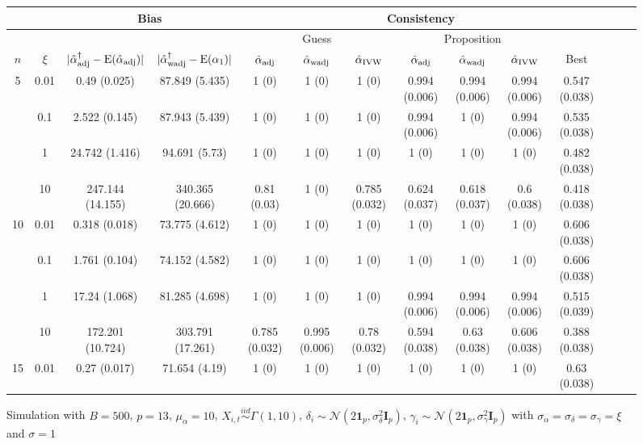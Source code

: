 \documentclass[11pt]{article}
\newcommand{\simiid}{\stackrel{iid}{\sim}} %
\def\normal#1#2{\mathcal{N}(#1,#2)} %
\def\E#1{\mathrm{E}(#1)} %
\theoremstyle{definition}
\begin{document}
\begin{sidewaysfigure}
\centering
\caption{Simulation  with $B = 500$, $p = 13$, $\mu_{\alpha}=10$, $X_{i,t} \simiid \Gamma(1,10)$, $\delta_i \sim \normal{2\mathbf{1}_p}{\sigma^2_{\delta}\mathbf{I}_p}$, $\gamma_i \sim \normal{2\mathbf{1}_p}{\sigma^2_{\gamma}\mathbf{I}_p}$ with $\sigma_{\alpha} = \sigma_{\delta}=\sigma_{\gamma}=\xi$ and $\sigma = 1$}
\begin{tabular}{cc|cc|ccc|ccc|ccc|c}
  & & \multicolumn{2}{c|}{Bias}  & \multicolumn{7}{c}{Consistency}  \\ 
  \hline 
  & &  & & \multicolumn{3}{|c|}{Guess} & \multicolumn{3}{|c|}{Proposition} & \\ 
$n$   & $\xi$ & $|\hat{\alpha}_{\rm adj}^{\dagger}-\E{\hat{\alpha}_{\rm adj}}|$ & $|\hat{\alpha}_{\rm wadj}^{\dagger}-\E{\alpha_1}|$ & $\hat{\alpha}_{\rm adj}$  & $\hat{\alpha}_{\rm wadj}$ & $\hat{\alpha}_{\rm IVW}$ & $\hat{\alpha}_{\rm adj}$  & $\hat{\alpha}_{\rm wadj}$ & $\hat{\alpha}_{\rm IVW}$ &  Best \\[.3cm]  
  \hline
\multirow{4}{*}{5} & 0.01 & 0.49 (0.025) & 87.849 (5.435) & 1 (0) & 1 (0) & 1 (0) & 0.994 (0.006) & 0.994 (0.006) & 0.994 (0.006) & 0.547 (0.038) \\ 
   & 0.1 & 2.522 (0.145) & 87.943 (5.439) & 1 (0) & 1 (0) & 1 (0) & 0.994 (0.006) & 1 (0) & 0.994 (0.006) & 0.535 (0.038) \\ 
   & 1 & 24.742 (1.416) & 94.691 (5.73) & 1 (0) & 1 (0) & 1 (0) & 1 (0) & 1 (0) & 1 (0) & 0.482 (0.038) \\ 
    & 10 & 247.144 (14.155) & 340.365 (20.666) & 0.81 (0.03) & 1 (0) & 0.785 (0.032) & 0.624 (0.037) & 0.618 (0.037) & 0.6 (0.038) & 0.418 (0.038) \\[.3cm]  
  \multirow{4}{*}{10} & 0.01 & 0.318 (0.018) & 73.775 (4.612) & 1 (0) & 1 (0) & 1 (0) & 1 (0) & 1 (0) & 1 (0) & 0.606 (0.038) \\ 
  & 0.1 & 1.761 (0.104) & 74.152 (4.582) & 1 (0) & 1 (0) & 1 (0) & 1 (0) & 1 (0) & 1 (0) & 0.606 (0.038) \\ 
  & 1 & 17.24 (1.068) & 81.285 (4.698) & 1 (0) & 1 (0) & 1 (0) & 0.994 (0.006) & 0.994 (0.006) & 0.994 (0.006) & 0.515 (0.039) \\ 
  & 10 & 172.201 (10.724) & 303.791 (17.261) & 0.785 (0.032) & 0.995 (0.006) & 0.78 (0.032) & 0.594 (0.038) & 0.63 (0.038) & 0.606 (0.038) & 0.388 (0.038) \\[.3cm]  
   \multirow{4}{*}{15}& 0.01 & 0.27 (0.017) & 71.654 (4.19) & 1 (0) & 1 (0) & 1 (0) & 1 (0) & 1 (0) & 1 (0) & 0.63 (0.038) \\ 

\end{tabular}
\end{sidewaysfigure}
\end{document}
